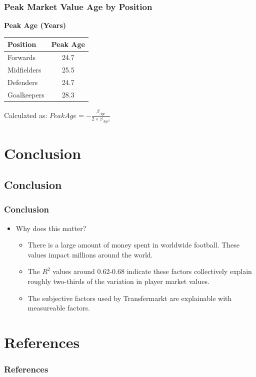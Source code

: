 \documentclass[t,aspectratio=169,xcolor=dvipsnames]{beamer}
\begin{document}
\begin{frame}
    \frametitle{Peak Market Value Age by Position} 
    
    \begin{center}
        \Large
        \textbf{Peak Age (Years)}
        
        \vspace{1cm}
        \begin{tabular}{lc}
            \hline
            \textbf{Position} & \textbf{Peak Age} \\
            \hline
            Forwards & 24.7 \\
            Midfielders & 25.5 \\
            Defenders & 24.7 \\
            Goalkeepers & 28.3 \\
            \hline
        \end{tabular}
        
        \normalsize
        Calculated as: $Peak Age = -\frac{\beta_{Age}}{2 \times \beta_{Age^2}}$
    \end{center}
\end{frame}
\section{Conclusion}
\subsection*{Conclusion}
\begin{frame}[shrink=15]
    \frametitle{Conclusion}
    
    \begin{itemize}\setlength{\itemsep}{0pt}
    
      \item Why does this matter?
      \begin{itemize}\setlength{\itemsep}{0pt}
        \item There is a large amount of money spent in worldwide football. These values impact millions around the world.         
        \item The $R^2$ values around 0.62-0.68 indicate these factors collectively explain roughly two-thirds of the variation in player market values. 
        \item The subjective factors used by Transfermarkt are explainable with measureable factors. 
      \end{itemize}
      \vspace{0.2cm}
    \end{itemize}
\end{frame}
\section{References}
\begin{frame}
\frametitle{References}


\end{frame}

\end{document}
